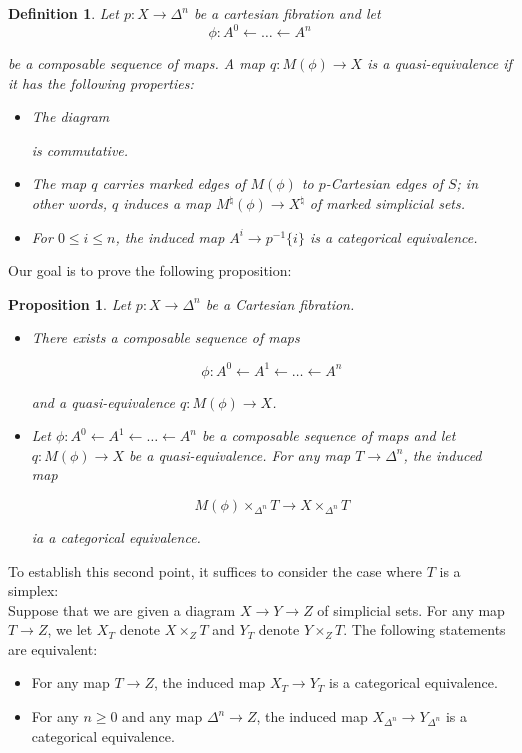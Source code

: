 \documentclass[12pt]{amsart}
\newcommand{\8}{\ensuremath{\infty}}
\newtheorem{definition}{Definition}
\newtheorem{proposition}{Proposition}
\begin{document}
\begin{definition}
  Let $p:X\rightarrow \Delta^n$ be a cartesian fibration and let
  $$
    \phi:A^0\leftarrow\dots\leftarrow A^n
  $$

  be a composable sequence of maps. A map $q:M(\phi)\rightarrow X$ is a quasi-equivalence if it has the following properties:
  \begin{itemize}
    \item The diagram
          is commutative.
    \item The map $q$ carries marked edges of $M(\phi)$ to $p$-Cartesian edges of $S$; in other words, $q$ induces a map $M^\natural(\phi)\rightarrow X^\natural$ of marked simplicial sets.
    \item For $0\leq i\leq n$, the induced map $A^i\rightarrow p^{-1}\{i\}$ is a categorical equivalence.
  \end{itemize}
\end{definition}

Our goal is to prove the following proposition:
\begin{proposition}
  Let $p:X\rightarrow \Delta^n$ be a Cartesian fibration.
  \begin{itemize}
    \item There exists a composable sequence of maps

          $$
            \phi:A^0\leftarrow A^1\leftarrow \dots \leftarrow A^n
          $$

          and a quasi-equivalence $q:M(\phi)\rightarrow X$.
    \item Let $\phi:A^0\leftarrow A^1\leftarrow \dots\leftarrow A^n$ be a composable sequence of maps and let $q:M(\phi)\rightarrow X$ be a quasi-equivalence. For any map $T\rightarrow \Delta^n$, the induced map

          $$
            M(\phi)\times_{\Delta^n}T\rightarrow X\times_{\Delta^n}T
          $$

          ia a categorical equivalence.
  \end{itemize}
\end{proposition}

To establish this second point, it suffices to consider the case where $T$ is a simplex:\\
Suppose that we are given a diagram $X\rightarrow Y\rightarrow Z$ of simplicial sets. For any map $T\rightarrow Z$, we let $X_T$ denote $X\times_Z T$ and $Y_T$ denote $Y\times_Z T$. The following statements are equivalent:
\begin{itemize}
  \item For any map $T\rightarrow Z$, the induced map $X_T\rightarrow Y_T$ is a categorical equivalence.
  \item For any $n\geq 0$ and any map $\Delta^n\rightarrow Z$, the induced map $X_{\Delta^n}\rightarrow Y_{\Delta^n}$ is a categorical equivalence.
\end{itemize}
\end{document}
